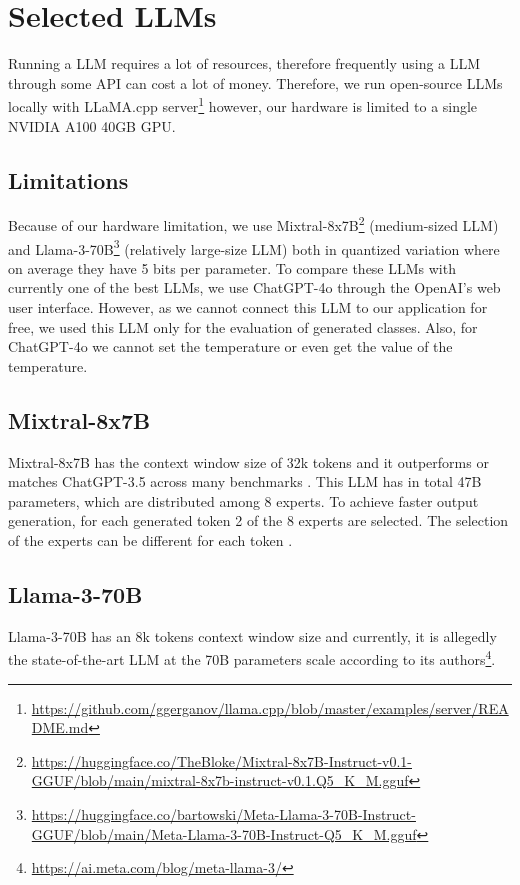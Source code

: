 \section{Selected LLMs}

Running a LLM requires a lot of resources, therefore frequently using a LLM through some API can cost a lot of money. Therefore, we run open-source LLMs locally with LLaMA.cpp server\footnote{\url{https://github.com/ggerganov/llama.cpp/blob/master/examples/server/README.md}} however, our hardware is limited to a single NVIDIA A100 40GB GPU.


\subsection{Limitations}

Because of our hardware limitation, we use Mixtral-8x7B\footnote{\url{https://huggingface.co/TheBloke/Mixtral-8x7B-Instruct-v0.1-GGUF/blob/main/mixtral-8x7b-instruct-v0.1.Q5_K_M.gguf}} (medium-sized LLM) \cite{Jiang2024} and Llama-3-70B\footnote{\url{https://huggingface.co/bartowski/Meta-Llama-3-70B-Instruct-GGUF/blob/main/Meta-Llama-3-70B-Instruct-Q5_K_M.gguf}} (relatively large-size LLM) both in quantized variation where on average they have 5 bits per parameter. To compare these LLMs with currently one of the best LLMs, we use ChatGPT-4o through the OpenAI's web user interface. However, as we cannot connect this LLM to our application for free, we used this LLM only for the evaluation of generated classes. Also, for ChatGPT-4o we cannot set the temperature or even get the value of the temperature.


\subsection{Mixtral-8x7B}

Mixtral-8x7B has the context window size of 32k tokens and it outperforms or matches ChatGPT-3.5 across many benchmarks \cite{Jiang2024}. This LLM has in total 47B parameters, which are distributed among 8 experts. To achieve faster output generation, for each generated token 2 of the 8 experts are selected. The selection of the experts can be different for each token \cite{Jiang2024}.


\subsection{Llama-3-70B}

Llama-3-70B has an 8k tokens context window size and currently, it is allegedly the state-of-the-art LLM at the 70B parameters scale according to its authors\footnote{\url{https://ai.meta.com/blog/meta-llama-3/}}.


